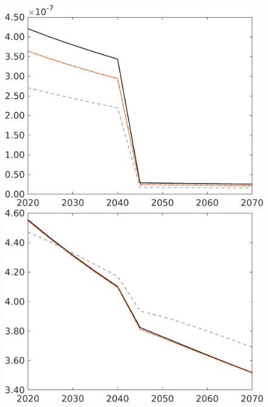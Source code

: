 \begin{figure}[h!!!]
\begin{minipage}[]{0.32\textwidth}
\end{minipage}
\begin{minipage}[]{0.32\textwidth}
	\includegraphics[width=1\textwidth]{../../codding_model/own_basedOnFried/optimalPol_010922_revision/figures/all_13Sept22/CompRed_TaulCalib_gAf_spillover0_knspil0_nsk0_xgr0_sep0_LFlimit1_emsbase0_countec0_GovRev0_etaa0.79_lgd0.png}
\end{minipage}
\begin{minipage}[]{0.32\textwidth}
	\includegraphics[width=1\textwidth]{../../codding_model/own_basedOnFried/optimalPol_010922_revision/figures/all_13Sept22/CompRed_TaulCalib_gAn_spillover0_knspil0_nsk0_xgr0_sep0_LFlimit1_emsbase0_countec0_GovRev0_etaa0.79_lgd0.png}

\end{minipage}
\end{figure}
